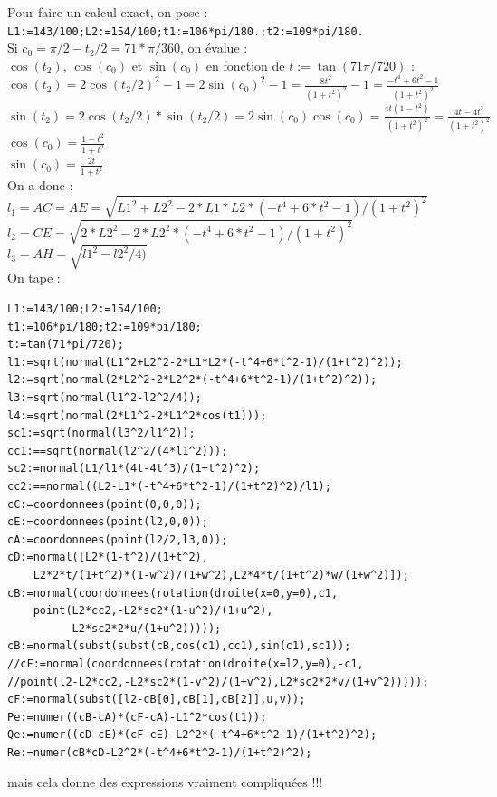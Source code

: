 \documentclass[a4paper,11pt]{book}
\begin{document}
Pour faire un calcul exact, on pose :\\
{\tt L1:=143/100;L2:=154/100;t1:=106*pi/180.;t2:=109*pi/180.}\\
Si $c_0=\pi/2-t_2/2=71*\pi/360$, on \'evalue :\\
$\cos(t_2)$, $\cos(c_0)$ et $\sin(c_0)$ en fonction de $t:=\tan(71\pi/720)$ :\\
$\displaystyle \cos(t_2)=2\cos(t_2/2)^2-1=2\sin(c_0)^2-1=\frac{8t^2}{(1+t^2)^2}-1=\frac{-t^4+6t^2-1}{(1+t^2)^2}$\\
$\displaystyle \sin(t_2)=2\cos(t_2/2)*\sin(t_2/2)=2\sin(c_0)\cos(c_0)=
\frac{4t(1-t^2)}{(1+t^2)^2}=\frac{4t-4t^3}{(1+t^2)^2}$\\

$\displaystyle \cos(c_0)=\frac{1-t^2}{1+t^2}$ \\
$\displaystyle \sin(c_0)=\frac{2t}{1+t^2}$\\
On a donc :\\
$l_1=AC=AE=\sqrt{L1^2+L2^2-2*L1*L2*(-t^4+6*t^2-1)/(1+t^2)^2}$\\
$l_2=CE=\sqrt{2*L2^2-2*L2^2*(-t^4+6*t^2-1)/(1+t^2)^2}$\\
$l_3=AH=\sqrt{l1^2-l2^2/4)}$\\
On tape :
\begin{verbatim}
L1:=143/100;L2:=154/100;
t1:=106*pi/180;t2:=109*pi/180;
t:=tan(71*pi/720);
l1:=sqrt(normal(L1^2+L2^2-2*L1*L2*(-t^4+6*t^2-1)/(1+t^2)^2));
l2:=sqrt(normal(2*L2^2-2*L2^2*(-t^4+6*t^2-1)/(1+t^2)^2));
l3:=sqrt(normal(l1^2-l2^2/4));
l4:=sqrt(normal(2*L1^2-2*L1^2*cos(t1)));
sc1:=sqrt(normal(l3^2/l1^2));
cc1:==sqrt(normal(l2^2/(4*l1^2)));
sc2:=normal(L1/l1*(4t-4t^3)/(1+t^2)^2);
cc2:==normal((L2-L1*(-t^4+6*t^2-1)/(1+t^2)^2)/l1);
cC:=coordonnees(point(0,0,0));
cE:=coordonnees(point(l2,0,0));
cA:=coordonnees(point(l2/2,l3,0));
cD:=normal([L2*(1-t^2)/(1+t^2),
    L2*2*t/(1+t^2)*(1-w^2)/(1+w^2),L2*4*t/(1+t^2)*w/(1+w^2)]);
cB:=normal(coordonnees(rotation(droite(x=0,y=0),c1,
    point(L2*cc2,-L2*sc2*(1-u^2)/(1+u^2),
          L2*sc2*2*u/(1+u^2)))));
cB:=normal(subst(subst(cB,cos(c1),cc1),sin(c1),sc1));
//cF:=normal(coordonnees(rotation(droite(x=l2,y=0),-c1,
//point(l2-L2*cc2,-L2*sc2*(1-v^2)/(1+v^2),L2*sc2*2*v/(1+v^2)))));
cF:=normal(subst([l2-cB[0],cB[1],cB[2]],u,v));
Pe:=numer((cB-cA)*(cF-cA)-L1^2*cos(t1));
Qe:=numer((cD-cE)*(cF-cE)-L2^2*(-t^4+6*t^2-1)/(1+t^2)^2);
Re:=numer(cB*cD-L2^2*(-t^4+6*t^2-1)/(1+t^2)^2);
\end{verbatim}
mais cela donne des expressions vraiment compliqu\'ees !!!
\end{document}
